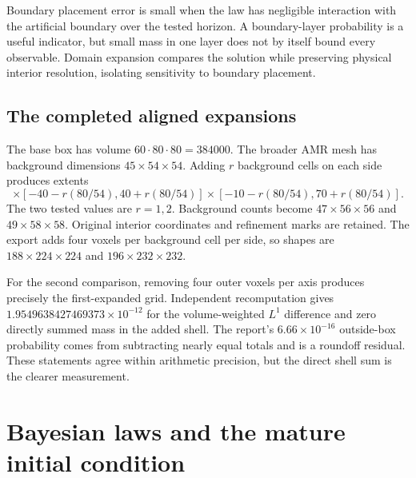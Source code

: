 Boundary placement error is small when the law has negligible interaction with the artificial boundary over the tested horizon. A boundary-layer probability is a useful indicator, but small mass in one layer does not by itself bound every observable. Domain expansion compares the solution while preserving physical interior resolution, isolating sensitivity to boundary placement.

\section{The completed aligned expansions}
The base box has volume $60\cdot80\cdot80=384000$. The broader AMR mesh has background dimensions $45\times54\times54$. Adding $r$ background cells on each side produces extents
\begin{equation}
[-30-r(60/45),30+r(60/45)]\times[-40-r(80/54),40+r(80/54)]\times[-10-r(80/54),70+r(80/54)].
\end{equation}
The two tested values are $r=1,2$. Background counts become $47\times56\times56$ and $49\times58\times58$. Original interior coordinates and refinement marks are retained. The export adds four voxels per background cell per side, so shapes are $188\times224\times224$ and $196\times232\times232$.

For the second comparison, removing four outer voxels per axis produces precisely the first-expanded grid. Independent recomputation gives $1.9549638427469373\times10^{-12}$ for the volume-weighted $L^1$ difference and zero directly summed mass in the added shell. The report's $6.66\times10^{-16}$ outside-box probability comes from subtracting nearly equal totals and is a roundoff residual. These statements agree within arithmetic precision, but the direct shell sum is the clearer measurement.


\chapter{Bayesian laws and the mature initial condition}\label{ch:bayes}
